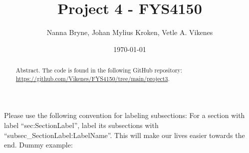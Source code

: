 



\title{Project 4 - FYS4150} 
\author{Nanna Bryne, Johan Mylius Kroken, Vetle A. Vikenes} 
\date{\today}                             
\noaffiliation                            

\begin{abstract}
    Abstract. The code is found in the following GitHub repository: \url{https://github.com/Vikenes/FYS4150/tree/main/project3}.
\end{abstract}
\maketitle


\alert{Please use the following convention for labeling subsections: For a section with label ``sec:SectionLabel'', label its subsections with ``subsec\_SectionLabel:LabelName''. This will make our lives easier towards the end. Dummy example:}


  

   















 



